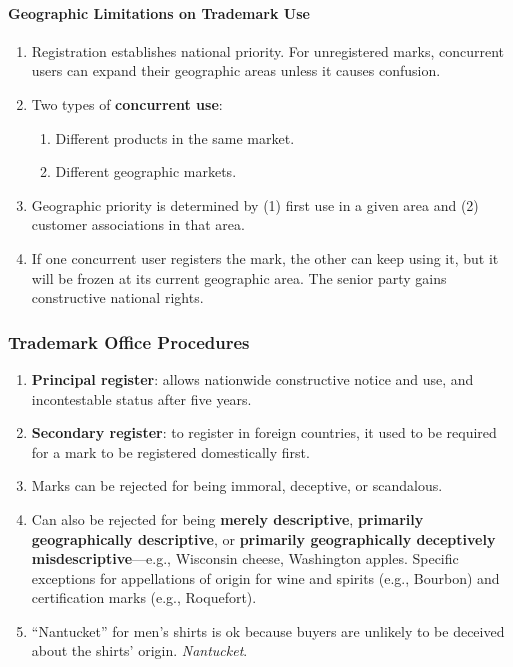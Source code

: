 \paragraph{Geographic Limitations on Trademark Use}

\begin{enumerate}
    \item Registration establishes national priority. For unregistered marks, 
    concurrent users can expand their geographic areas unless it causes 
    confusion.
    \item Two types of \textbf{concurrent use}:
    \begin{enumerate}
        \item Different products in the same market.
        \item Different geographic markets.
    \end{enumerate}
    \item Geographic priority is determined by (1) first use in a given area 
    and (2) customer associations in that area.
    \item If one concurrent user registers the mark, the other can keep using 
    it, but it will be frozen at its current geographic area. The senior party 
    gains constructive national rights.
\end{enumerate}

\subsubsection{Trademark Office Procedures}

\begin{enumerate}
    \item \textbf{Principal register}: allows nationwide constructive notice 
    and use, and incontestable status after five years.
    \item \textbf{Secondary register}: to register in foreign countries, it 
    used to be required for a mark to be registered domestically first.
    \item Marks can be rejected for being immoral, deceptive, or scandalous.
    \item Can also be rejected for being \textbf{merely descriptive}, 
    \textbf{primarily geographically descriptive}, or \textbf{primarily 
    geographically deceptively misdescriptive}---e.g., Wisconsin cheese, 
    Washington apples. Specific exceptions for appellations of origin for wine 
    and spirits (e.g., Bourbon) and certification marks (e.g., Roquefort).
    \item ``Nantucket'' for men's shirts is ok because buyers are unlikely to 
    be deceived about the shirts' origin. \emph{Nantucket}.
\end{enumerate}

